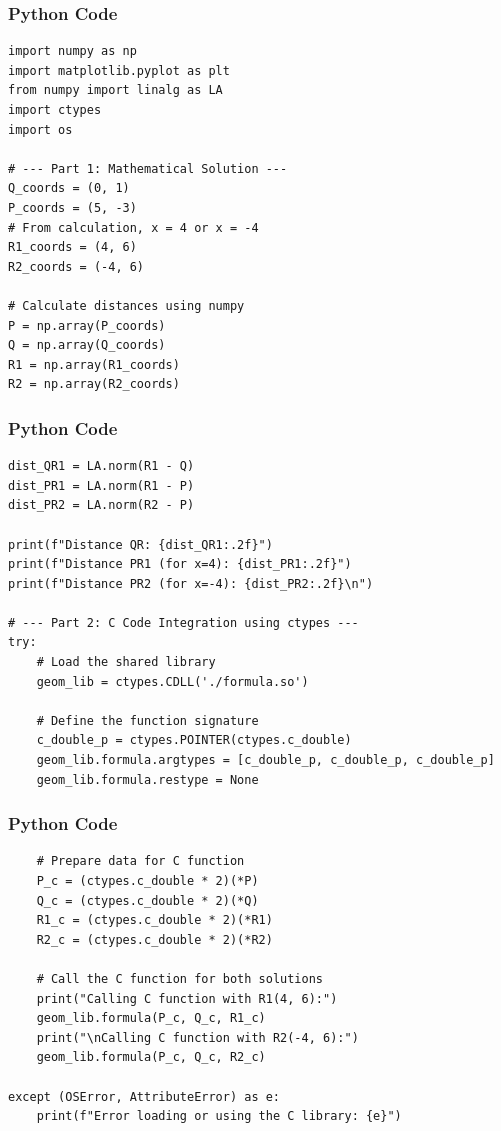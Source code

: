 \documentclass{beamer}
\begin{document}
\begin{frame}[fragile]
    \frametitle{Python Code}
    \begin{lstlisting}
import numpy as np
import matplotlib.pyplot as plt
from numpy import linalg as LA
import ctypes
import os

# --- Part 1: Mathematical Solution ---
Q_coords = (0, 1)
P_coords = (5, -3)
# From calculation, x = 4 or x = -4
R1_coords = (4, 6)
R2_coords = (-4, 6)

# Calculate distances using numpy
P = np.array(P_coords)
Q = np.array(Q_coords)
R1 = np.array(R1_coords)
R2 = np.array(R2_coords)
    \end{lstlisting}
\end{frame}


\begin{frame}[fragile]
    \frametitle{Python Code}
    \begin{lstlisting}
dist_QR1 = LA.norm(R1 - Q)
dist_PR1 = LA.norm(R1 - P)
dist_PR2 = LA.norm(R2 - P)

print(f"Distance QR: {dist_QR1:.2f}")
print(f"Distance PR1 (for x=4): {dist_PR1:.2f}")
print(f"Distance PR2 (for x=-4): {dist_PR2:.2f}\n")

# --- Part 2: C Code Integration using ctypes ---
try:
    # Load the shared library
    geom_lib = ctypes.CDLL('./formula.so')

    # Define the function signature
    c_double_p = ctypes.POINTER(ctypes.c_double)
    geom_lib.formula.argtypes = [c_double_p, c_double_p, c_double_p]
    geom_lib.formula.restype = None
    \end{lstlisting}
\end{frame}


\begin{frame}[fragile]
    \frametitle{Python Code}
    \begin{lstlisting}
    # Prepare data for C function
    P_c = (ctypes.c_double * 2)(*P)
    Q_c = (ctypes.c_double * 2)(*Q)
    R1_c = (ctypes.c_double * 2)(*R1)
    R2_c = (ctypes.c_double * 2)(*R2)

    # Call the C function for both solutions
    print("Calling C function with R1(4, 6):")
    geom_lib.formula(P_c, Q_c, R1_c)
    print("\nCalling C function with R2(-4, 6):")
    geom_lib.formula(P_c, Q_c, R2_c)

except (OSError, AttributeError) as e:
    print(f"Error loading or using the C library: {e}")
    \end{lstlisting}
\end{frame}
\end{document}
